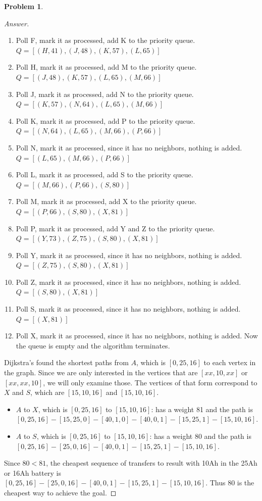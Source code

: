\documentclass[11pt]{article}
\theoremstyle{definition}
\theoremstyle{definition}
\newtheorem{required}{Problem}
\theoremstyle{definition}
\begin{document}
\begin{required}
\begin{enumerate}[label=(\alph*)]
\begin{proof}[Answer]
\begin{enumerate}[label=\arabic*)]
\item Poll F, mark it as processed, add K to the priority queue. $Q= [(H,41), (J,48), (K,57), (L,65)]$
\item Poll H, mark it as processed, add M to the priority queue. $Q= [(J,48), (K,57), (L,65), (M,66)]$
\item Poll J, mark it as processed, add N to the priority queue. $Q= [(K,57), (N,64),(L,65), (M,66)]$
\item Poll K, mark it as processed, add P to the priority queue. $Q= [(N,64),(L,65), (M,66), (P,66)]$
\item Poll N, mark it as processed, since it has no neighbors, nothing is added. $Q= [(L,65), (M,66), (P,66)]$
\item Poll L, mark it as processed, add S to the priority queue. $Q= [(M,66), (P,66),(S,80)]$
\item Poll M, mark it as processed, add X to the priority queue. $Q= [(P,66),(S,80),(X,81)]$
\item Poll P, mark it as processed, add Y and Z to the priority queue. $Q= [(Y,73),(Z,75),(S,80),(X,81)]$
\item Poll Y, mark it as processed, since it has no neighbors, nothing is added. $Q= [(Z,75),(S,80),(X,81)]$
\item Poll Z, mark it as processed, since it has no neighbors, nothing is added. $Q= [(S,80),(X,81)]$
\item Poll S, mark it as processed, since it has no neighbors, nothing is added. $Q= [(X,81)]$
\item Poll X, mark it as processed, since it has no neighbors, nothing is added. Now the queue is empty and the algorithm terminates.
\end{enumerate}
 Dijkstra's found the shortest paths from $A$, which is $[0,25,16]$ to each vertex in the graph. Since we are only interested in the vertices that are  $[xx, 10, xx]$ or $[xx,xx,10]$, we will only examine those. The vertices of that form correspond to $X$ and $S$, which are $[15,10,16]$ and $[15, 10, 16]$.
		\begin{itemize}
		\item $A$ to $X$, which is $[0, 25, 16]$ to $[15,10,16]$: has a weight 81 and the path is \\ $[0, 25, 16]-[15, 25, 0]-[40, 1, 0]-[40, 0, 1]-[15, 25, 1]-[15, 10, 16]$. 
		\item $A$ to $S$, which is $[0, 25, 16]$ to $[15,10,16]$: has a weight 80 and the path is \\ $[0, 25, 16]-[25, 0, 16]-[40, 0, 1]-[15, 25, 1]-[15, 10, 16]$. 
		\end{itemize}
Since $80 < 81$, the cheapest sequence of transfers to result with 10Ah in the 25Ah or 16Ah battery is \\ $[0, 25, 16]-[25, 0, 16]-[40, 0, 1]-[15, 25, 1]-[15, 10, 16]$. Thus 80 is the cheapest way to achieve the goal.
\end{proof}
\end{enumerate}
\end{required}
\end{document}
